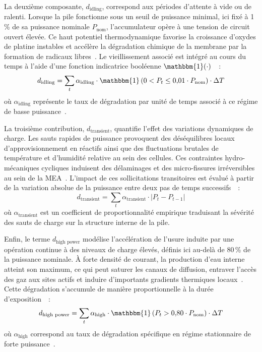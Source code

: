 La deuxième composante, $d_{\text{idling}}$, correspond aux périodes d'attente à vide ou de ralenti. Lorsque la pile fonctionne sous un seuil de puissance minimal, ici fixé à 1\,\% de sa puissance nominale $P_{\text{nom}}$, l'accumulateur opère à une tension de circuit ouvert élevée. Ce haut potentiel thermodynamique favorise la croissance d'oxydes de platine instables et accélère la dégradation chimique de la membrane par la formation de radicaux libres~\cite{nguyen_comprehensive_2023}. Le vieillissement associé est intégré au cours du temps à l'aide d'une fonction indicatrice booléenne $\mathbbm{1}(\cdot)$~\cite{pei_quick_2008}~:
\begin{equation}
    d_{\text{idling}} = \sum_t \alpha_{\text{idling}} \cdot \mathbbm{1}\left(0 < P_t \le 0{,}01 \cdot P_{\text{nom}}\right) \cdot \Delta T
    \label{eq:fc_idling}
\end{equation}
où $\alpha_{\text{idling}}$ représente le taux de dégradation par unité de temps associé à ce régime de basse puissance~\cite{pei_quick_2008}.

La troisième contribution, $d_{\text{transient}}$, quantifie l'effet des variations dynamiques de charge. Les sauts rapides de puissance provoquent des déséquilibres locaux d'approvisionnement en réactifs ainsi que des fluctuations brutales de température et d'humidité relative au sein des cellules. Ces contraintes hydro-mécaniques cycliques induisent des délaminages et des micro-fissures irréversibles au sein de la MEA~\cite{foniok_mechanisms_2025}. L'impact de ces sollicitations transitoires est évalué à partir de la variation absolue de la puissance entre deux pas de temps successifs~\cite{pei_quick_2008}~:
\begin{equation}
    d_{\text{transient}} = \sum_t \alpha_{\text{transient}} \cdot |P_t - P_{t-1}|
    \label{eq:fc_transient}
\end{equation}
où $\alpha_{\text{transient}}$ est un coefficient de proportionnalité empirique traduisant la sévérité des sauts de charge sur la structure interne de la pile.

Enfin, le terme $d_{\text{high power}}$ modélise l'accélération de l'usure induite par une opération continue à des niveaux de charge élevés, définis ici au-delà de 80\,\% de la puissance nominale. À forte densité de courant, la production d'eau interne atteint son maximum, ce qui peut saturer les canaux de diffusion, entraver l'accès des gaz aux sites actifs et induire d'importants gradients thermiques locaux~\cite{nguyen_comprehensive_2023}. Cette dégradation s'accumule de manière proportionnelle à la durée d'exposition~\cite{pei_quick_2008}~:
\begin{equation}
    d_{\text{high power}} = \sum_t \alpha_{\text{high}} \cdot \mathbbm{1}\left(P_t > 0{,}80 \cdot P_{\text{nom}}\right) \cdot \Delta T
    \label{eq:fc_high_power}
\end{equation}
où $\alpha_{\text{high}}$ correspond au taux de dégradation spécifique en régime stationnaire de forte puissance~\cite{pei_quick_2008}.

